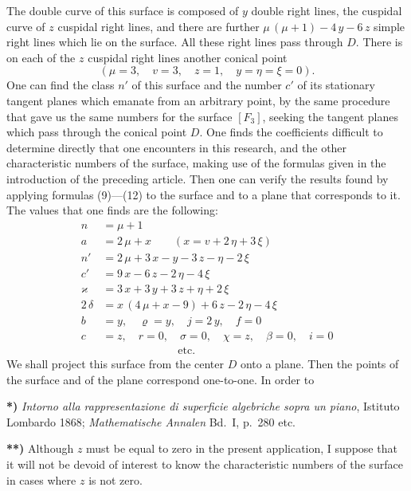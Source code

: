 \documentclass{article}
\begin{document}
The double curve of this surface is composed of $y$ double right lines, the cuspidal curve of $z$ cuspidal right lines, and there are further $\mu\,(\mu + 1) - 4\,y - 6\,z$ simple right lines which lie on the surface. All these right lines pass through $D$. There is on each of the $z$ cuspidal right lines another conical point
\[
(\mu = 3, \quad v = 3, \quad z = 1, \quad y = \eta = \xi = 0).
\]
One can find the class $n'$ of this surface and the number $c'$ of its stationary tangent planes which emanate from an arbitrary point, by the same procedure that gave us the same numbers for the surface $[F_3]$, seeking the tangent planes which pass through the conical point $D$. One finds the coefficients difficult to determine directly that one encounters in this research, and the other characteristic numbers of the surface, making use of the formulas given in the introduction of the preceding article. Then one can verify the results found by applying formulas (9)---(12) to the surface and to a plane that corresponds to it. The values that one finds are the following:
\[
\begin{aligned}
n &= \mu + 1 \\
a &= 2\,\mu + x \qquad (x = v + 2\,\eta + 3\,\xi) \\
n' &= 2\,\mu + 3\,x - y - 3\,z - \eta - 2\,\xi \\
c' &= 9\,x - 6\,z - 2\,\eta - 4\,\xi \\
\varkappa &= 3\,x + 3\,y + 3\,z + \eta + 2\,\xi \\
2\,\delta &= x\,(4\,\mu + x - 9) + 6\,z - 2\,\eta - 4\,\xi \\
b &= y, \quad \varrho = y, \quad j = 2\,y, \quad f = 0 \\
c &= z, \quad r = 0, \quad \sigma = 0, \quad \chi = z, \quad \beta = 0, \quad i = 0 \\
&\phantom{{}=} \qquad\qquad\qquad \text{etc.}
\end{aligned}
\]
We shall project this surface from the center $D$ onto a plane. Then the points of the surface and of the plane correspond one-to-one. In order to

\textbf{*)} \emph{Intorno alla rappresentazione di superficie algebriche sopra un piano}, Istituto Lombardo 1868; \emph{Mathematische Annalen} Bd.~I, p.~280 etc.

\textbf{**)} Although $z$ must be equal to zero in the present application, I suppose that it will not be devoid of interest to know the characteristic numbers of the surface in cases where $z$ is not zero.
\end{document}
